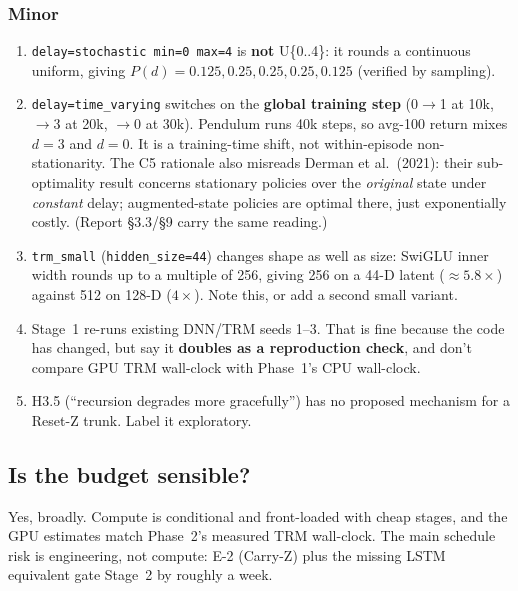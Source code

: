\documentclass[11pt]{article}
\begin{document}
\subsubsection*{Minor}
\begin{enumerate}[start=10]
  \item \texttt{delay=stochastic min=0 max=4} is \textbf{not} U\{0..4\}: it rounds a continuous uniform, giving $P(d)=0.125,0.25,0.25,0.25,0.125$ (verified by sampling).
  \item \texttt{delay=time\_varying} switches on the \textbf{global training step} (0$\to$1 at 10k, $\to$3 at 20k, $\to$0 at 30k). Pendulum runs 40k steps, so avg-100 return mixes $d=3$ and $d=0$. It is a training-time shift, not within-episode non-stationarity. The C5 rationale also misreads Derman et al.\ (2021): their sub-optimality result concerns stationary policies over the \emph{original} state under \emph{constant} delay; augmented-state policies are optimal there, just exponentially costly. (Report \S3.3/\S9 carry the same reading.)
  \item \texttt{trm\_small} (\texttt{hidden\_size=44}) changes shape as well as size: SwiGLU inner width rounds up to a multiple of 256, giving 256 on a 44-D latent (${\approx}5.8\times$) against 512 on 128-D ($4\times$). Note this, or add a second small variant.
  \item Stage~1 re-runs existing DNN/TRM seeds 1--3. That is fine because the code has changed, but say it \textbf{doubles as a reproduction check}, and don't compare GPU TRM wall-clock with Phase~1's CPU wall-clock.
  \item H3.5 (``recursion degrades more gracefully'') has no proposed mechanism for a Reset-Z trunk. Label it exploratory.
\end{enumerate}

\subsection{Is the budget sensible?}
Yes, broadly. Compute is conditional and front-loaded with cheap stages, and the GPU estimates match Phase~2's measured TRM wall-clock. The main schedule risk is engineering, not compute: E-2 (Carry-Z) plus the missing LSTM equivalent gate Stage~2 by roughly a week.
\end{document}
